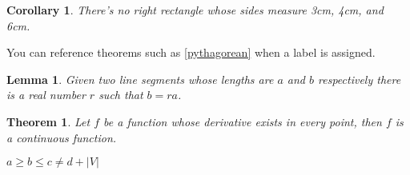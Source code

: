 \documentclass[12pt,ngerman]{scrreprt}
\newtheorem{theorem}{Theorem}[chapter]
\newtheorem{corollary}{Corollary}[chapter]
\newtheorem{lemma}{Lemma}[chapter]
\begin{document}
\begin{corollary}
There's no right rectangle whose sides measure 3cm, 4cm, and 6cm.
\end{corollary}

You can reference theorems such as \ref{pythagorean} when a label is assigned.

\begin{lemma}
Given two line segments whose lengths are \(a\) and \(b\) respectively there is a 
real number \(r\) such that \(b=ra\).
\end{lemma}

\begin{theorem}
Let \(f\) be a function whose derivative exists in every point, then \(f\) is 
a continuous function.
\end{theorem}

\( a \geq b \leq c \not= d + |V| \)
\end{document}
